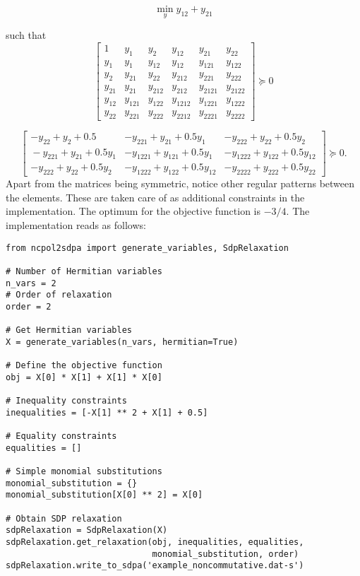 \documentclass{article}
\begin{document}
\[ \min_{y}y_{12}+y_{21}\]

such that
\[
\left[\begin{array}{c|cc|ccc}
1 & y_{1} & y_{2} & y_{12} & y_{21} & y_{22}\\
\hline{}
y_{1} & y_{1} & y_{12} & y_{12} & y_{121} & y_{122}\\
y_{2} & y_{21} & y_{22} & y_{212} & y_{221} & y_{222}\\
\hline{}
y_{21} & y_{21} & y_{212} & y_{212} & y_{2121} & y_{2122} \\
y_{12} & y_{121} & y_{122} & y_{1212} & y_{1221} & y_{1222}\\
y_{22} & y_{221} & y_{222} & y_{2212} & y_{2221} & y_{2222}
\end{array} \right] \succeq{}0
\]

\[
\left[ \begin{array}{c|cc}
-y_{22}+y_{2}+0.5 & -y_{221}+y_{21}+0.5y_{1} & -y_{222}+y_{22}+0.5y_{2}\\
\hline{}
-y_{221}+y_{21}+0.5y_{1} & -y_{1221}+y_{121}+0.5y_{1} & -y_{1222}+y_{122}+0.5y_{12}\\
-y_{222}+y_{22}+0.5y_{2} & -y_{1222}+y_{122}+0.5y_{12} & -y_{2222}+y_{222}+0.5y_{22}
\end{array}\right]\succeq{}0.
\]
Apart from the matrices being symmetric, notice other regular patterns between the elements. These are taken care of as additional constraints in the implementation. The optimum for the objective function is $-3/4$. The implementation reads as follows:
\begin{verbatim}
from ncpol2sdpa import generate_variables, SdpRelaxation

# Number of Hermitian variables
n_vars = 2
# Order of relaxation
order = 2

# Get Hermitian variables
X = generate_variables(n_vars, hermitian=True)

# Define the objective function
obj = X[0] * X[1] + X[1] * X[0]

# Inequality constraints
inequalities = [-X[1] ** 2 + X[1] + 0.5]

# Equality constraints
equalities = []

# Simple monomial substitutions
monomial_substitution = {}
monomial_substitution[X[0] ** 2] = X[0]

# Obtain SDP relaxation
sdpRelaxation = SdpRelaxation(X)
sdpRelaxation.get_relaxation(obj, inequalities, equalities,
                             monomial_substitution, order)
sdpRelaxation.write_to_sdpa('example_noncommutative.dat-s')
\end{verbatim}
\end{document}

